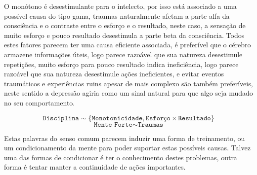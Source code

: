 \documentclass[10pt,a4paper]{report}
\begin{document}
\hrulefill

O monótono é desestimulante para o intelecto, por isso está associado a uma possível causa do tipo gama, traumas naturalmente afetam a parte alfa da consciência e o contraste entre o esforço e o resultado, neste caso, a sensação de muito esforço e pouco resultado desestimula a parte beta da consciência. Todos estes fatores parecem ter uma causa eficiente associada, é preferível que o cérebro armazene informações úteis, logo parece razoável que sua natureza desestimule repetições, muito esforço para pouco resultado indica ineficiência, logo parece razoável que sua natureza desestimule ações ineficientes, e evitar eventos traumáticos e experiências ruins apesar de mais complexo são também preferíveis, neste sentido a depressão agiria como um sinal natural para que algo seja mudado no seu comportamento.

$$ \texttt{Disciplina} \sim \{ \texttt{Monotonicidade} ,\texttt{Esforço}\times \texttt{Resultado} \} $$
$$ \texttt{Mente Forte} \sim \texttt{Traumas} $$

Estas palavras do senso comum parecem induzir uma forma de treinamento, ou um condicionamento da mente para poder suportar estas possíveis causas. Talvez uma das formas de condicionar é ter o conhecimento destes problemas, outra forma é tentar manter a continuidade de ações importantes.

\hspace{\baselineskip}





\end{document}
